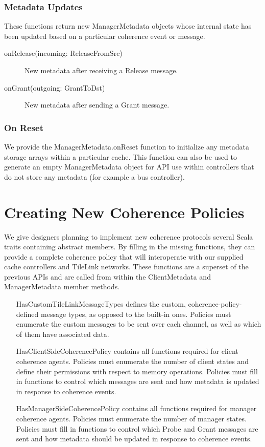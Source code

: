 \subsubsection{Metadata Updates}

These functions return new ManagerMetadata objects whose internal state has been updated based on a particular coherence event or message.

\begin{description}
\item[onRelease(incoming: ReleaseFromSrc) ]
New metadata after receiving a Release message.
\item[onGrant(outgoing: GrantToDst) ]
New metadata after sending a Grant message.
\end{description}

\subsubsection{On Reset}

We provide the ManagerMetadata.onReset function to initialize
any metadata storage arrays within a particular cache.
This function can also be used to generate an empty ManagerMetadata object for API 
use within controllers that do not store any metadata (for example a bus controller).

\section{Creating New Coherence Policies}

We give designers planning to implement new coherence protocols several Scala traits
containing abstract members.
By filling in the missing functions, they can provide a complete coherence policy
that will interoperate with our supplied cache controllers and TileLink networks.
These functions are a superset of the previous APIs and are called from within the
ClientMetadata and ManagerMetadata member methods.

\begin{itemize}
\item[HasCustomTileLinkMessageTypes] defines the custom, coherence-policy-defined message types, as opposed to the built-in ones. Policies must enumerate the custom messages to be sent over each channel, as well as which of them have associated data.
\item[HasClientSideCoherencePolicy] contains all functions required for client coherence agents. Policies must enumerate the number of client states and define their permissions with respect to memory operations. Policies must fill in functions to control which messages are sent and how metadata is updated in response to coherence events.
\item[HasManagerSideCoherencePolicy] contains all functions required for manager coherence agents. Policies must enumerate the number of manager states. Policies must fill in functions to control which Probe and Grant messages are sent and how  metadata should be updated in response to coherence events.
\end{itemize}


